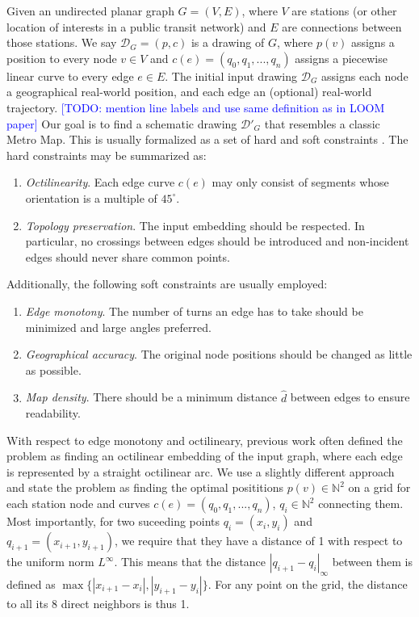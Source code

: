 \documentclass{sig-alternate-sigmod09}
\newcommand\TODO[1]{\textcolor{blue}{\small [TODO: #1]}}
\begin{document}
Given an undirected planar graph $G = (V, E)$, where $V$ are stations (or other location of interests in a public transit network) and $E$ are connections between those stations. We say $\mathcal{D}_G = (p, c)$ is a drawing of $G$, where $p(v)$ assigns a position to every node $v \in V$ and $c(e) = (q_0, q_1, ..., q_n)$ assigns a piecewise linear curve to every edge $e \in E$. The initial input drawing $\mathcal{D}_G$ assigns each node a geographical real-world position, and each edge an (optional) real-world trajectory.
\TODO{mention line labels and use same definition as in LOOM paper}
Our goal is to find a schematic drawing $\mathcal{D}'_G$ that resembles a classic Metro Map.
This is usually formalized as a set of hard and soft constraints \cite{nb, ...}.
The hard constraints may be summarized as:
\begin{enumerate}
\setlength\itemsep{.1em}
\item \emph{Octilinearity}. Each edge curve $c(e)$ may only consist of segments whose orientation is a multiple of $45^{\circ}$.
\item \emph{Topology preservation}. The input embedding should be respected. In particular, no crossings between edges should be introduced and non-incident edges should never share common points.
\end{enumerate}
Additionally, the following soft constraints are usually employed:
\begin{enumerate}
\setlength\itemsep{.1em}
\item \emph{Edge monotony}. The number of turns an edge has to take should be minimized and large angles preferred.
\item \emph{Geographical accuracy}. The original node positions should be changed as little as possible.
\item \emph{Map density}. There should be a minimum distance $\hat d$ between edges to ensure readability.
\end{enumerate}

With respect to edge monotony and octilineary, previous work often defined the problem as finding an octilinear embedding of the input graph, where each edge is represented by a straight octilinear arc.
We use a slightly different approach and state the problem as finding the optimal posititions $p(v) \in \mathbb{N}^2$ on a grid for each station node and curves $c(e) = (q_0, q_1, ..., q_n)$, $q_i \in \mathbb{N}^2$ connecting them. 
Most importantly, for two suceeding points $q_i = (x_i, y_i)$ and $q_{i+1} = (x_{i+1}, y_{i+1})$, we require that they have a distance of 1 with respect to the uniform norm $L^{\infty}$.
This means that the distance $|q_{i+1} - q_{i}|_{\infty}$ between them is defined as $\max \{|x_{i+1} - x_i|, |y_{i+1} - y_i|\}$.
For any point on the grid, the distance to all its 8 direct neighbors is thus 1.
\end{document}
